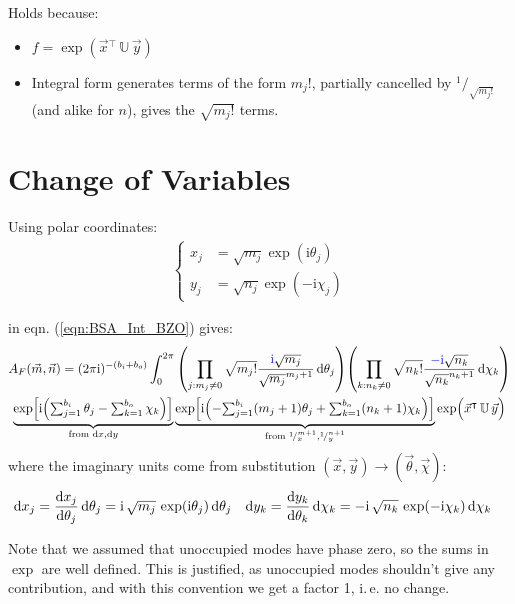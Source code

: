 \documentclass[
	english,
	a4paper,
	fontsize=10pt,
	parskip=half,
	titlepage=true,
	DIV=12,
	final
]{scrreprt}
\newcommand*{\ie}{i.\,e.\xspace}
\newcommand*{\smallfrac}  [2]{\ensuremath{{}^        {#1} \!/_        {#2}}}
\newcommand*{\transp}{\ensuremath{^\intercal}}
\newcommand*{\iunit}{\ensuremath{\mathrm{i}}}
\begin{document}
Holds because:
\begin{itemize}
\item $f = \exp( \vec{x}\transp \, \mathbb{U} \, \vec{y})$
\item Integral form generates terms of the form $m_j!$, partially cancelled by $\smallfrac{1}{\sqrt{m_j!}}$ (and alike for $n$), gives the $\sqrt{m_j!}$ terms.
\end{itemize}

\section{Change of Variables}
Using polar coordinates:
\begin{align}
	\begin{cases}
	x_j &= \sqrt{m_j} \exp( \iunit \theta_j) \\
	y_j &= \sqrt{n_j} \exp(-\iunit \chi  _j)
	\end{cases}
	\label{eqn:DefXY}
\end{align}

in eqn. (\ref{eqn:BSA_Int_BZO}) gives:
\begin{multline}
	A_F(\vec{m}, \vec{n})
=
	(2\pi\iunit)^{-(b_i + b_o)}
	\int_{0}^{2\pi}
		\qty( \prod_{j : m_j \neq 0}
			\sqrt{m_j!}
			\frac
				{ {\color{blue} \iunit} \sqrt{m_j}}
				{ \sqrt{m_j}^{m_j + 1} }
			\dd{\theta_j}
		)
		\qty( \prod_{k : n_k \neq 0}
			\sqrt{n_k!}
			\frac
				{ {\color{blue} -\iunit} \sqrt{n_k}}
				{ \sqrt{n_k}^{n_k + 1} }
			\dd{\chi_k}
		)
\\
	\underbrace{
		\exp[ \iunit \qty(
			{\textstyle \sum_{j=1}^{b_i} \theta_j} - 
			{\textstyle \sum_{k=1}^{b_o} \chi  _k}
		)]
	}_{\text{from } \dd{x}, \dd{y}}
	\underbrace{
		\exp[
			\iunit \qty(
				-{\textstyle \sum_{j=1}^{b_i} (m_j + 1) \theta_j}
				+{\textstyle \sum_{k=1}^{b_o} (n_k + 1) \chi  _k}
		)]
	}_{\text{from } \smallfrac{1}{x}^{m+1}, \smallfrac{1}{y}^{n+1}}
	\exp( \Big. \vec{x}\transp \, \mathbb{U} \, \vec{y})
\end{multline}
where the imaginary units come from substitution $(\vec{x}, \vec{y}) \to (\vec{\theta}, \vec{\chi})$:
\begin{align}
	\dd{x_j}
&=
	\dv{x_j}{\theta_j} \dd{\theta_j}
=
	\iunit \, \sqrt{m_j} \, \exp(\iunit \theta_j) \dd{\theta_j}
&
	\dd{y_k}
&=
	\dv{y_k}{\theta_k} \dd{\chi_k}
=
	-\iunit \, \sqrt{n_k} \, \exp(-\iunit \chi_k) \dd{\chi_k}
\end{align}

Note that we assumed that unoccupied modes have phase zero, so the sums in $\exp$ are well defined. This is justified, as unoccupied modes shouldn't give any contribution, and with this convention we get a factor 1, \ie no change.
\end{document}
